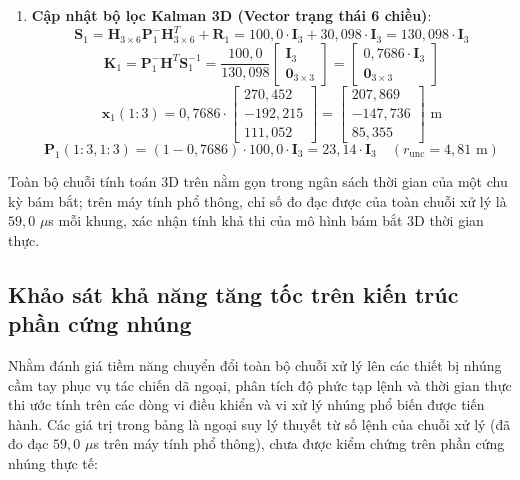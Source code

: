 \begin{enumerate}
    \item \textbf{Cập nhật bộ lọc Kalman 3D (Vector trạng thái 6 chiều)}:
    \begin{equation}
    \mathbf{S}_1 = \mathbf{H}_{3 \times 6} \mathbf{P}_1^- \mathbf{H}_{3 \times 6}^T + \mathbf{R}_1 = 100{,}0 \cdot \mathbf{I}_3 + 30{,}098 \cdot \mathbf{I}_3 = 130{,}098 \cdot \mathbf{I}_3
    \end{equation}
    \begin{equation}
    \mathbf{K}_1 = \mathbf{P}_1^- \mathbf{H}^T \mathbf{S}_1^{-1} = \frac{100{,}0}{130{,}098} \begin{bmatrix} \mathbf{I}_3 \\ \mathbf{0}_{3 \times 3} \end{bmatrix} = \begin{bmatrix} 0{,}7686 \cdot \mathbf{I}_3 \\ \mathbf{0}_{3 \times 3} \end{bmatrix}
    \end{equation}
    \begin{equation}
    \hat{\mathbf{x}}_1(1:3) = 0{,}7686 \cdot \begin{bmatrix} 270{,}452 \\ -192{,}215 \\ 111{,}052 \end{bmatrix} = \begin{bmatrix} 207{,}869 \\ -147{,}736 \\ 85{,}355 \end{bmatrix} \text{ m}
    \end{equation}
    \begin{equation}
    \mathbf{P}_1(1:3, 1:3) = (1 - 0{,}7686) \cdot 100{,}0 \cdot \mathbf{I}_3 = 23{,}14 \cdot \mathbf{I}_3 \quad (r_{\text{unc}} = 4{,}81\text{ m})
    \end{equation}
\end{enumerate}

Toàn bộ chuỗi tính toán 3D trên nằm gọn trong ngân sách thời gian của một chu kỳ bám bắt; trên máy tính phổ thông, chỉ số đo đạc được của toàn chuỗi xử lý là $59{,}0$ $\mu$s mỗi khung, xác nhận tính khả thi của mô hình bám bắt 3D thời gian thực.

\subsection{Khảo sát khả năng tăng tốc trên kiến trúc phần cứng nhúng}

\hspace{0.5cm} Nhằm đánh giá tiềm năng chuyển đổi toàn bộ chuỗi xử lý lên các thiết bị nhúng cầm tay phục vụ tác chiến dã ngoại, phân tích độ phức tạp lệnh và thời gian thực thi ước tính trên các dòng vi điều khiển và vi xử lý nhúng phổ biến được tiến hành. Các giá trị trong bảng là ngoại suy lý thuyết từ số lệnh của chuỗi xử lý (đã đo đạc $59{,}0$ $\mu$s trên máy tính phổ thông), chưa được kiểm chứng trên phần cứng nhúng thực tế:

